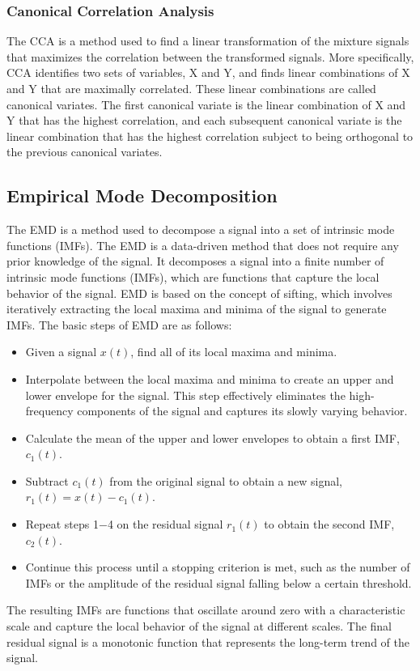 \documentclass[a4paper, noexaminfo]{sapthesis}
\begin{document}
\subsubsection{Canonical Correlation Analysis}
The CCA\cite{cca} is a method used to find a linear transformation of the
mixture signals that maximizes the correlation between the transformed signals.
More specifically, CCA identifies two sets of variables, X and Y, and 
finds linear combinations of X and Y that are maximally correlated. 
These linear combinations are called canonical variates.
 The first canonical variate is the linear combination of X and Y that 
 has the highest correlation, and each subsequent canonical variate is 
 the linear combination that has the highest correlation subject to being
  orthogonal to the previous canonical variates.
\newline

\subsection{Empirical Mode Decomposition}\label{sec:emd}
The EMD\cite{emd} is a method used to decompose a signal into a set of
intrinsic mode functions (IMFs). The EMD is a data-driven method that
does not require any prior knowledge of the signal. \newline
It decomposes a signal into a finite number of intrinsic mode functions
 (IMFs), which are functions that capture the local behavior of the signal.
  EMD is based on the concept of sifting, which involves iteratively
 extracting the local maxima and minima of the signal to generate IMFs.
The basic steps of EMD are as follows:
\begin{itemize}
    \item Given a signal $x(t)$, find all of its local maxima and minima.
    \item Interpolate between the local maxima and minima to create an
    upper and lower envelope for the signal. This step effectively
     eliminates the high-frequency components of the signal and 
     captures its slowly varying behavior.
    \item Calculate the mean of the upper and lower envelopes to obtain a
     first IMF, $c_1(t)$.
    \item Subtract $c_1(t)$ from the original signal to obtain a new signal,
        $r_1(t) = x(t) - c_1(t)$.
    \item Repeat steps 1$-$4 on the residual signal $r_1(t)$ to obtain the
        second IMF, $c_2(t)$.
    \item Continue this process until a stopping criterion is met, such as
        the number of IMFs or the amplitude of the residual signal falling
        below a certain threshold.
\end{itemize}
The resulting IMFs are functions that oscillate around zero with a 
characteristic scale and capture the local behavior of the signal at 
different scales. The final residual signal is a monotonic function that 
represents the long-term trend of the signal.
\end{document}
